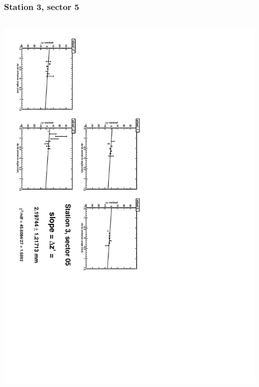 \documentclass[compress]{beamer}
\begin{document}
\begin{frame}
\frametitle{Station 3, sector 5}
\begin{columns}
\includegraphics[height=\linewidth, angle=90]{zfits/zfit_3_05.pdf}


\end{columns}
\end{frame}
\end{document}
